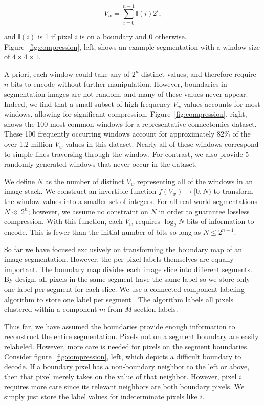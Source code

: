 \begin{equation}
V_w = \sum_{i = 0}^{n - 1} \mathbb{I}(i) 2^i,
\end{equation}

\noindent
and $\mathbb{I}(i)$ is 1 if pixel $i$ is on a boundary and 0 otherwise. 
Figure~\ref{fig:compression}, left, shows an example segmentation with a window size of $4 \times 4 \times 1$.

A priori, each window could take any of $2^n$ distinct values, and therefore require $n$ bits to encode without further manipulation. 
However, boundaries in segmentation images are not random, and many of these values never appear. 
Indeed, we find that a small subset of high-frequency $V_w$ values accounts for most windows, allowing for significant compression. 
Figure~\ref{fig:compression}, right, shows the 100 most common windows for a representative connectomics dataset. 
These 100 frequently occurring windows account for approximately 82\% of the over 1.2 million $V_w$ values in this dataset.
Nearly all of these windows correspond to simple lines traversing through the window. 
For contrast, we also provide 5 randomly generated windows that never occur in the dataset.


We define $N$ as the number of distinct $V_w$ representing all of the windows in an image stack. 
We construct an invertible function $f(V_w) \to [0, N)$ to transform the window values into a smaller set of integers. 
For all real-world segmentations $N \ll 2^n$; however, we assume no constraint on $N$ in order to guarantee lossless compression. 
With this function, each $V_w$ requires $\log_2{N}$ bits of information to encode. 
This is fewer than the initial number of bits so long as $N \leq 2^{n - 1}$.  

So far we have focused exclusively on transforming the boundary map of an image segmentation. 
However, the per-pixel labels themselves are equally important. 
The boundary map divides each image slice into different segments. 
By design, all pixels in the same segment have the same label so we store only one label per segment for each slice. 
We use a connected-component labeling algorithm to store one label per segment \cite{he2009fast}. 
The algorithm labels all pixels clustered within a component $m$ from $M$ section labels.

Thus far, we have assumed the boundaries provide enough information to reconstruct the entire segmentation.
Pixels not on a segment boundary are easily relabeled.
However, more care is needed for pixels on the segment boundaries. 
Consider figure~\ref{fig:compression}, left, which depicts a difficult boundary to decode. 
If a boundary pixel has a non-boundary neighbor to the left or above, then that pixel merely takes on the value of that neighbor. 
However, pixel $i$ requires more care since its relevant neighbors are both boundary pixels. 
We simply just store the label values for indeterminate pixels like $i$.

